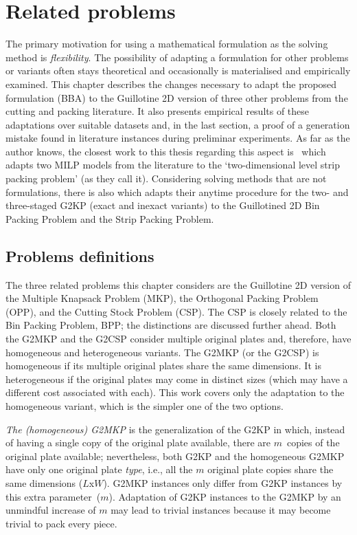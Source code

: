 \chapter{Related problems}
\label{sec:other_problems}

The primary motivation for using a mathematical formulation as the solving method is \emph{flexibility}.
The possibility of adapting a formulation for other problems or variants often stays theoretical and occasionally is materialised and empirically examined.
This chapter describes the changes necessary to adapt the proposed formulation (BBA) to the Guillotine 2D version of three other problems from the cutting and packing literature.
It also presents empirical results of these adaptations over suitable datasets and, in the last section, a proof of a generation mistake found in literature instances during preliminar experiments.
As far as the author knows, the closest work to this thesis regarding this aspect is~\citet{bezerra:2020} which adapts two MILP models from the literature to the `two-dimensional level strip packing problem' (as they call it).
Considering solving methods that are not formulations, there is also \citet{fontan:2020} which adapts their anytime procedure for the two- and three-staged G2KP (exact and inexact variants) to the Guillotined 2D Bin Packing Problem and the Strip Packing Problem.

\section{Problems definitions}

The three related problems this chapter considers are the Guillotine 2D version of the Multiple Knapsack Problem (MKP), the Orthogonal Packing Problem (OPP), and the Cutting Stock Problem (CSP).
The CSP is closely related to the Bin Packing Problem, BPP; the distinctions are discussed further ahead.
Both the G2MKP and the G2CSP consider multiple original plates and, therefore, have homogeneous and heterogeneous variants.
The G2MKP (or the G2CSP) is homogeneous if its multiple original plates share the same dimensions.
It is heterogeneous if the original plates may come in distinct sizes (which may have a different cost associated with each).
 This work covers only the adaptation to the homogeneous variant, which is the simpler one of the two options.

\emph{The (homogeneous) G2MKP} is the generalization of the G2KP in which, instead of having a single copy of the original plate available, there are \(m\)~copies of the original plate available; nevertheless, both G2KP and the homogeneous G2MKP have only one original plate \emph{type}, i.e., all the \(m\) original plate copies share the same dimensions (\(L\)x\(W\)).
G2MKP instances only differ from G2KP instances by this extra parameter~(\(m\)).
Adaptation of G2KP instances to the G2MKP by an unmindful increase of \(m\) may lead to trivial instances because it may become trivial to pack every piece.


